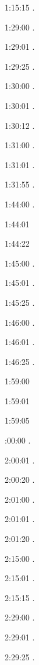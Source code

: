 1:15:15 . 

1:29:00 . 

1:29:01 . 

1:29:25 . 

1:30:00 .

1:30:01 .

1:30:12 .

1:31:00 .

1:31:01 .

1:31:55 .

1:44:00 .

1:44:01 

1:44:22 

1:45:00 .

1:45:01 .

1:45:25 .

1:46:00 .

1:46:01 .

1:46:25 .

1:59:00 

1:59:01 

1:59:05 

:00:00 .

2:00:01 . 

2:00:20 .

2:01:00 . 

2:01:01 .

2:01:20 . 

2:15:00 . 

2:15:01 . 

2:15:15 . 

2:29:00 . 

2:29:01 . 

2:29:25 . 

